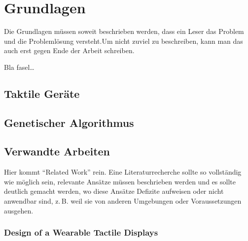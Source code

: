 
\chapter{Grundlagen}
\label{ch:Grundlagen}
Die Grundlagen müssen soweit beschrieben
werden, dass ein Leser das Problem und
die Probleml{\"o}sung  versteht.Um nicht zuviel 
zu beschreiben, kann man das auch erst gegen 
Ende der Arbeit schreiben.

Bla fasel\ldots

\section{Taktile Ger{\"a}te}
\label{ch:Grundlagen:sec:Taktile Ger{\"a}te}






\section{Genetischer Algorithmus}
\label{ch:Grundlagen:sec:Genetischer Algorithmus}




\section{Verwandte Arbeiten}
\label{ch:Grundlagen:sec:RelatedWork}
Hier kommt "`Related Work"' rein.
Eine Literaturrecherche sollte so vollst{\"a}ndig wie m{\"o}glich sein,
relevante Ans{\"a}tze m{\"u}ssen beschrieben werden und es sollte deutlich 
gemacht werden, wo diese Ans{\"a}tze Defizite aufweisen oder nicht
anwendbar sind, z.\,B. weil sie von anderen Umgebungen oder 
Voraussetzungen ausgehen.




\subsection{Design of a Wearable Tactile Displays}




